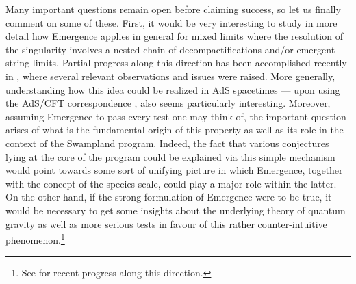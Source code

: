 Many important questions remain open before claiming success, so let us finally comment on some of these. First, it would be very interesting to study in more detail how Emergence applies in general for mixed limits where the resolution of the singularity involves a nested chain of decompactifications and/or emergent string limits. Partial progress along this direction has been accomplished recently in \cite{Blumenhagen:2023yws}, where several relevant observations and issues were raised. More generally, understanding how this idea could be realized in AdS spacetimes --- upon using the AdS/CFT correspondence \cite{Maldacena:1997re}, also seems particularly interesting. Moreover, assuming Emergence to pass every test one may think of, the important question arises of what is the fundamental origin of this property as well as its role in the context of the Swampland program. Indeed, the fact that various conjectures lying at the core of the program could be explained via this simple mechanism would point towards some sort of unifying picture in which Emergence, together with the concept of the species scale, could play a major role within the latter. On the other hand, if the strong formulation of Emergence were to be true, it would be necessary to get some insights about the underlying theory of quantum gravity as well as more serious tests in favour of this rather counter-intuitive phenomenon.\footnote{See \cite{Blumenhagen:2023tev,Blumenhagen:2023xmk, Hattab:2023moj,Hattab:2024thi} for recent progress along this direction.}

